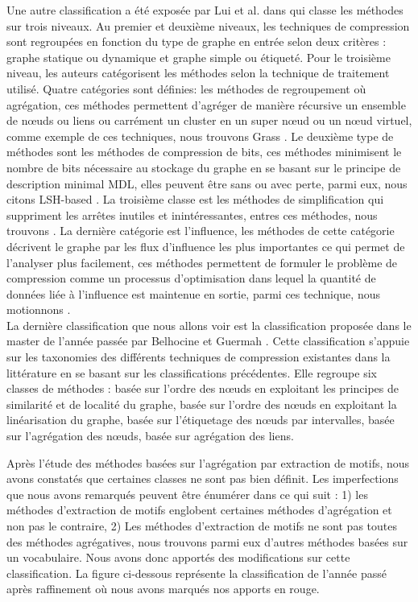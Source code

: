 Une autre classification a été exposée par Lui et al. dans \citep{liu2018graph} qui classe les méthodes sur trois niveaux. Au premier et deuxième niveaux, les techniques de compression sont regroupées en fonction du type de graphe en entrée selon deux critères : graphe statique ou dynamique et graphe simple ou étiqueté. Pour le troisième niveau, les auteurs catégorisent les méthodes selon la technique de traitement utilisé. Quatre catégories sont définies: les méthodes de regroupement où agrégation, ces méthodes permettent d'agréger de manière récursive un ensemble de nœuds ou liens ou carrément un cluster en un super nœud ou un nœud virtuel, comme exemple de ces techniques, nous trouvons Grass \citep{lefevre2010grass}. Le deuxième type de méthodes sont les méthodes de compression de bits, ces méthodes minimisent le nombre de bits nécessaire au stockage du graphe en se basant sur le principe de description minimal MDL, elles peuvent être sans ou avec perte, parmi eux, nous citons LSH-based \citep{khan2014set}. La troisième classe est les méthodes de simplification qui suppriment les arrêtes inutiles et inintéressantes, entres ces méthodes, nous trouvons \citep{shen2006visual}. La dernière catégorie est l'influence, les méthodes de cette catégorie décrivent le graphe par les flux d'influence les plus importantes ce qui permet de l'analyser plus facilement, ces méthodes permettent de formuler le problème de compression comme un processus d'optimisation dans lequel la quantité de données liée à l'influence est maintenue en sortie, parmi ces technique, nous motionnons \citep{shi2015vegas}.\\


La dernière classification que nous allons voir est la classification proposée dans le master de l'année passée par Belhocine et Guermah \citep{master2017}. Cette classification s'appuie sur les taxonomies des différents techniques de compression existantes dans la littérature en se basant sur les classifications précédentes. Elle regroupe six classes de méthodes :  basée sur l'ordre des nœuds en exploitant les principes de similarité et de localité du graphe, basée sur l'ordre des nœuds en exploitant la linéarisation du graphe, basée sur l'étiquetage des nœuds par intervalles, basée sur l'agrégation des nœuds, basée sur agrégation des liens. 

Après l'étude des méthodes basées sur l'agrégation par extraction de motifs, nous avons constatés que certaines classes ne sont pas bien définit. Les imperfections que nous avons remarqués peuvent être énumérer dans ce qui suit : 1) les méthodes d'extraction de motifs englobent certaines méthodes d'agrégation et non pas le contraire, 2) Les méthodes d'extraction de motifs ne sont pas toutes des méthodes agrégatives, nous trouvons parmi eux d'autres méthodes basées sur un vocabulaire. Nous avons donc apportés des modifications sur cette classification. La figure ci-dessous représente la classification de l'année passé après raffinement où nous avons marqués nos apports en rouge.

